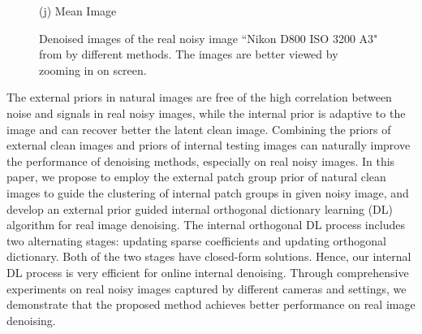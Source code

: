 \documentclass[10pt,twocolumn,letterpaper]{article}
\begin{document}
\begin{figure}
{\begin{minipage}[t]{0.195\textwidth}
{\footnotesize (j) Mean Image \cite{crosschannel2016} }
\end{minipage}
}\vspace{-1mm}
\caption{Denoised images of the real noisy image ``Nikon D800 ISO 3200 A3" from \cite{crosschannel2016} by different methods. The images are better viewed by zooming in on screen.} 
\vspace{-3mm}
\label{fig1}
\end{figure}

The external priors in natural images are free of the high correlation between noise and signals in real noisy images, while the internal prior is adaptive to the image and can recover better the latent clean image. Combining the priors of external clean images and priors of internal testing images can naturally improve the performance of denoising methods, especially on real noisy images. In this paper, we propose to employ the external patch group prior \cite{pgpd} of natural clean images to guide the clustering of internal patch groups in given noisy image, and develop an external prior guided internal orthogonal dictionary learning (DL) algorithm for real image denoising. The internal orthogonal DL process includes two alternating stages: updating sparse coefficients and updating orthogonal dictionary. Both of the two stages have closed-form solutions. Hence, our internal DL process is very efficient for online internal denoising. Through comprehensive experiments on real noisy images captured by different cameras and settings, we demonstrate that the proposed method achieves better performance on real image denoising.


\end{document}
